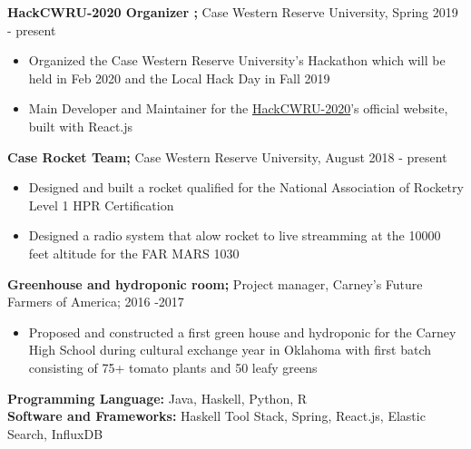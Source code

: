 \documentclass[a4paper,11pt]{article}
\begin{document}
\begin{flushleft}
	
	\textbf{HackCWRU-2020 Organizer ; } Case Western Reserve University, Spring 2019 - 
	present
	\vspace{-\topsep}
	\begin{itemize}
		\setlength{\parskip}{0pt}
		\setlength{\itemsep}{0pt plus 1pt}
		\item Organized the Case Western Reserve University's Hackathon which will be held in Feb 2020 and the Local Hack Day in Fall 2019 \\
		\item Main Developer and Maintainer for the \href{https://hackcwru.github.io/HackCWRU2020-Website/}{HackCWRU-2020}'s official website, built with React.js
	\end{itemize}

	\textbf{Case Rocket Team; } Case Western Reserve University, August 2018 - present
	\vspace{-\topsep}
	\begin{itemize}
		\setlength{\parskip}{0pt}
		\setlength{\itemsep}{0pt plus 1pt}
		\item Designed and built a rocket qualified for the National Association of Rocketry Level 1 HPR Certification
		\item Designed a radio system that alow rocket to live streamming at the 10000 feet altitude for the FAR MARS 1030
	\end{itemize}
	
	\textbf{Greenhouse and hydroponic room; }Project manager, Carney's Future Farmers of America; 2016 -2017
	\vspace{-\topsep}
	\begin{itemize}
		\setlength{\parskip}{0pt}
		\setlength{\itemsep}{0pt plus 1pt}
		\item Proposed and constructed a first green house and hydroponic for the Carney High School during cultural exchange year in Oklahoma with first batch consisting of 75+ tomato plants and 50 leafy greens 
	\end{itemize}
\vspace{-\topsep}
\centering{\noindent\makebox{\rule{8cm}{1.5pt}}}
\end{flushleft} 

\begin{flushleft}
	\textbf{Programming Language:} Java, Haskell, Python, R \\ 
	\doublespacing
	\textbf{Software and Frameworks:} Haskell Tool Stack, Spring, React.js, Elastic Search, InfluxDB \\
\vspace{-\topsep}
\centering{\noindent\makebox{\rule{8cm}{1.5pt}}}
\end{flushleft}
\end{document}
